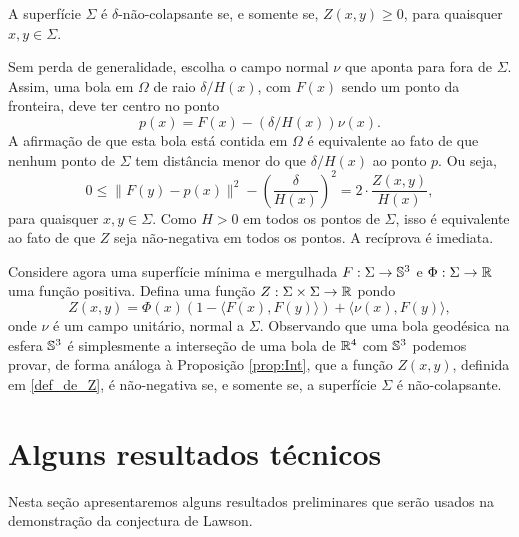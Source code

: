 \begin{proposicao}\label{prop:Int}
A superf\'icie $\Sigma$ \'e $\delta$-n\~ao-colapsante se, e somente
se, $Z(x,y)\geq0$, para quaisquer $x,y\in\Sigma$.
\end{proposicao}
\begin{demonstracao}
Sem perda de generalidade, escolha o campo normal $\nu$ que
aponta para fora de $\Sigma$. Assim, uma bola em $\Omega$ de
raio $\delta/H(x)$, com $F(x)$ sendo um ponto da fronteira, deve
ter centro no ponto
\[
p(x) = F(x) - (\delta/H(x))\nu(x).
\]
A afirma\c c\~ao de que esta bola est\'a contida em $\Omega$
\'e equivalente ao fato de que nenhum ponto de $\Sigma$ tem
dist\^ancia menor do que $\delta/H(x)$ ao ponto $p$. Ou seja,
\[
0\leq\|F(y)-p(x)\|^2-\left(\frac{\delta}{H(x)}\right)^2 = 
2\cdot\frac{Z(x,y)}{H(x)},
\]
para quaisquer $x,y\in\Sigma$. Como $H>0$ em todos os pontos
de $\Sigma$, isso \'e equivalente ao fato de que $Z$ seja
n\~ao-negativa em todos os pontos. A rec\'iprova \'e imediata.
\end{demonstracao}

Considere agora uma superf\'icie m\'inima e mergulhada 
$F:\Sigma\to\mathbb{S}^3$ e $ \Phi: \Sigma\to\mathbb{R}$ uma função positiva. Defina
uma função $Z:\Sigma\times\Sigma\to\mathbb{R}$ pondo
\begin{equation}\label{def_de_Z}
Z(x,y) = \Phi(x) (1 - \langle F(x),F(y) \rangle ) + \langle \nu(x), F(y) \rangle,
\end{equation}
onde $\nu$ \'e um campo unitário, normal a $\Sigma$. Observando que
uma bola geod\'esica na esfera $\mathbb{S}^3$ \'e simplesmente a interseção
de uma bola de $\mathbb{R}^4$ com $\mathbb{S}^3$ podemos provar, de forma
an\'aloga \`a Proposi\c c\~ao \ref{prop:Int}, que a fun\c c\~ao $Z(x,y)$,
definida em \eqref{def_de_Z}, \'e n\~ao-negativa se, e somente se,
a superf\'icie $\Sigma$ \'e n\~ao-colapsante.




\section{Alguns resultados t\'ecnicos}

Nesta se\c c\~ao apresentaremos alguns resultados preliminares
que ser\~ao usados na demonstra\c c\~ao da conjectura de
Lawson. 

\vspace{.2cm}

